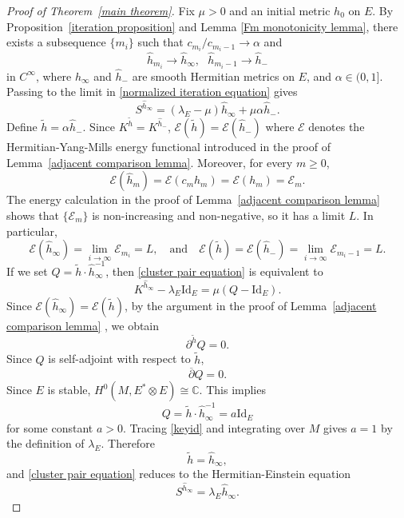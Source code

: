 \documentclass[12pt, reqno]{amsart}
\newcommand\cE{{\mathcal E}}
\newcommand{\id}{\mathrm{Id}}
\newcommand\bp{{\bar\partial}}
\theoremstyle{plain}
\theoremstyle{definition}
\newcommand{\p}{\partial}
\renewcommand{\bar}{\overline}
\newcommand{\beq}{\begin{equation}}
\newcommand{\eeq}{\end{equation}}
\renewcommand{\hat}{\widehat}
\renewcommand{\tilde}{\widetilde}
\newcommand{\qtq}[1]{\quad\mbox{#1}\quad}
\renewcommand{\bp}{\bar{\partial}}
\newcommand{\ts}{\otimes}
\renewcommand{\>}{\rightarrow}
\newcommand{\C}{{\mathbb C}}
\numberwithin{equation}{section}
\begin{document}
\baselineskip
\begin{proof}[Proof of Theorem~\ref{main theorem}]
	Fix $\mu>0$ and an initial metric $h_0$ on $E$. By Proposition~\ref{iteration proposition} and Lemma \ref{Fm monotonicity lemma}, there exists a subsequence $\{m_i\}$
	 such that  $ c_{m_i}/c_{m_i-1}\to\alpha$ and
	\beq
	\hat h_{m_i}\to \hat h_\infty,  \ \ \ \hat h_{m_i-1}\to  \hat h_-
	\eeq
 in $C^\infty$,	where $\hat h_\infty$ and $\hat h_-$ are smooth Hermitian metrics on $E$, and $\alpha\in (0,1]$.
	Passing to the limit in \eqref{normalized iteration equation} gives
	\begin{equation}
	S^{\hat h_\infty}=(\lambda_E-\mu)\hat h_\infty+\mu\alpha \hat h_-.
	\label{cluster pair equation}
	\end{equation}
	Define $\tilde h=\alpha \hat h_-$.  Since $K^{\tilde h}=K^{\hat h_-}$,  $\cE(\tilde h)=\cE(\hat h_-)$ where $\cE$  denotes the Hermitian-Yang-Mills energy functional introduced in the proof of Lemma~\ref{adjacent comparison lemma}. Moreover, for every $m\geq 0$,
	\[
	\cE(\hat h_m)=\cE(c_mh_m)=\cE(h_m)=\cE_m.
	\]
	The energy calculation in the proof of Lemma~\ref{adjacent comparison lemma}
	shows that $\{\cE_m\}$ is non-increasing and non-negative, so it has a limit
	$L$.  In particular,
	\beq
	\cE(\hat h_\infty)=\lim_{i\to\infty}\cE_{m_i}=L,
	\qtq{and}
	\cE(\tilde h)=\cE(\hat h_-)=\lim_{i\to\infty}\cE_{m_i-1}=L.\label{cluster energy equality}
	\eeq
	If we set 
	$Q=\tilde h\cdot \hat h_\infty^{-1}$, then \eqref{cluster pair equation} is equivalent to
	\beq K^{\hat h_\infty}-\lambda_E\mathrm{Id}_E=\mu \left(Q-\mathrm{Id}_E\right).\label{keyid}\eeq 
 Since $\cE(\hat h_\infty)=\cE(\tilde h)$,  by the argument in the proof of Lemma~\ref{adjacent comparison lemma} , we obtain 
	\beq \p^{\tilde h} Q=0.
	\eeq 
	Since $Q$ is self-adjoint with respect to
	$\tilde h$,  \beq \bp Q=0.\eeq  
	Since $E$ is stable, $H^0(M, E^*\ts E)\cong \C$. This implies
	\beq
Q=\tilde h\cdot \hat h_\infty^{-1}=a\id_E
	\eeq 
	for some constant $a>0$.  Tracing \eqref{keyid} and integrating over $M$ gives $a = 1$ by the definition of $\lambda_E$.
	Therefore \beq \tilde h=\hat h_\infty, \eeq and \eqref{cluster pair equation} reduces to the Hermitian-Einstein equation
	\beq
	S^{\hat h_\infty}=\lambda_E \hat h_\infty.
	\eeq 
	

\end{proof}
\end{document}
